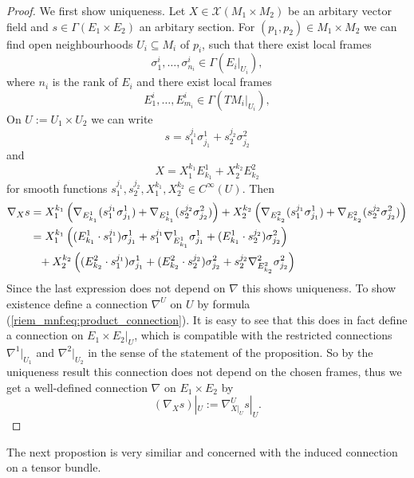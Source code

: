 \begin{proof}
    We first show uniqueness. Let $X \in \mathscr{X}(M_1\times M_2)$ be an arbitary vector field and $s \in \Gamma(E_1\times E_2)$ an arbitary section. For $(p_1,p_2) \in M_1 \times M_2$ we can find open neighbourhoods $U_i \subseteq M_i$ of $p_i$, such that there exist local frames 
    \[
    \sigma_1^i,\ldots,\sigma_{n_i}^i \in \Gamma(E_i|_{U_i}),
    \]
    where $n_i$ is the rank of $E_i$ and there exist local frames 
    \[
    E_1^i,\ldots,E_{m_i}^i \in \Gamma(TM_i|_{U_i}),
    \]
    On $U:= U_1 \times U_2$ we can write
    \[
    s = s_1^{j_1}\sigma_{j_1}^1 + s_2^{j_2}\sigma_{j_2}^2
    \]
    and
    \[
    X = X_1^{k_1}E_{k_1}^1 + X_2^{k_2}E_{k_2}^2
    \]
    for smooth functions $s_1^{j_1},s_2^{j_2},X_1^{k_1},X_2^{k_2} \in C^\infty(U)$. Then
    \begin{align}
        \nabla_X s &= X_1^{k_1}\left(\nabla_{E_{k_1}^1}(s_1^{j_1}\sigma_{j_1}^1) + \nabla_{E_{k_1}^1}(s_2^{j_2}\sigma_{j_2}^2)\right) + X_2^{k_2}\left(\nabla_{E_{k_2}^2}(s_1^{j_1}\sigma_{j_1}^1) + \nabla_{E_{k_2}^2}(s_2^{j_2}\sigma_{j_2}^2)\right) \notag \\
        &= X_1^{k_1}\left((E_{k_1}^1 \cdot s_1^{j_1})\sigma_{j_1}^1 + s_1^{j_1}\nabla^1_{E_{k_1}^1}\sigma_{j_1}^1 + (E_{k_1}^1 \cdot s_2^{j_2})\sigma_{j_2}^2\right) \notag\\
        &\phantom{=} + X_2^{k_2}\left((E_{k_2}^2 \cdot s_1^{j_1})\sigma_{j_1}^1 + (E_{k_2}^2 \cdot s_2^{j_2})\sigma_{j_2}^2 + s_2^{j_2}\nabla^2_{E_{k_2}^2}\sigma_{j_2}^2 \right) \label{riem_mnf:eq:product_connection}
    \end{align}
    Since the last expression does not depend on $\nabla$ this shows uniqueness. To show existence define a connection $\nabla^U$ on $U$ by formula (\ref{riem_mnf:eq:product_connection}). It is easy to see that this does in fact define a connection on $E_1 \times E_2|_U$, which is compatible with the restricted connections $\nabla^1|_{U_1}$ and $\nabla^2|_{U_2}$ in the sense of the statement of the proposition. So by the uniqueness result this connection does not depend on the chosen frames, thus we get a well-defined connection $\nabla$ on $E_1\times E_2$ by 
    \[
    (\nabla_Xs)|_U := \nabla^U_{X|_U}s|_U.
    \]
\end{proof}

The next propostion is very similiar and concerned with the induced connection on a tensor bundle.

